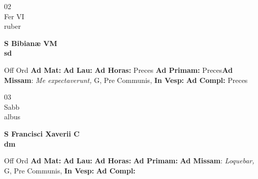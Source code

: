\documentclass[10pt, openany]{book}
\begin{document}
    \begin{center}
        \begin{minipage}{3.5in}
            \vspace{2em}
            \begin{minipage}{0.5in}
                {\Huge 02} \\
                {\normalsize Fer VI} \\
                {\normalsize ruber}
            \end{minipage}
            \begin{minipage}{3.0in}
                \textbf{ \large S Bibianæ VM \\
                \textnormal{\normalsize sd}} \\ 
            \end{minipage}
            \begin{justify}Off Ord
                \textbf{Ad Mat: }
                \textbf{Ad Lau: }
                \textbf{Ad Horas: }Preces
                \textbf{Ad Primam: }Preces\textbf{Ad Missam}: \textit{Me expectaverunt,} G, Pre Communis,  
                \textbf{In Vesp: }
                \textbf{Ad Compl: }Preces
            \end{justify}
        \end{minipage}
    \end{center}

    \begin{center}
        \begin{minipage}{3.5in}
            \vspace{2em}
            \begin{minipage}{0.5in}
                {\Huge 03} \\
                {\normalsize Sabb} \\
                {\normalsize albus}
            \end{minipage}
            \begin{minipage}{3.0in}
                \textbf{ \large S Francisci Xaverii C \\
                \textnormal{\normalsize dm}} \\ 
            \end{minipage}
            \begin{justify}Off Ord
                \textbf{Ad Mat: }
                \textbf{Ad Lau: }
                \textbf{Ad Horas: }
                \textbf{Ad Primam: }\textbf{Ad Missam}: \textit{Loquebar,} G, Pre Communis,  
                \textbf{In Vesp: }
                \textbf{Ad Compl: }
            \end{justify}
        \end{minipage}
    \end{center}
\end{document}
